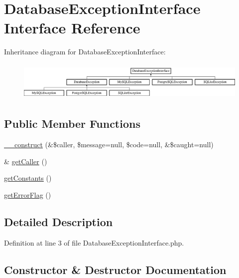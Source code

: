 \hypertarget{interface_database_exception_interface}{}\section{Database\+Exception\+Interface Interface Reference}
\label{interface_database_exception_interface}
Inheritance diagram for Database\+Exception\+Interface\+:\begin{figure}[H]
\begin{center}
\leavevmode
\includegraphics[height=1.887640cm]{interface_database_exception_interface}
\end{center}
\end{figure}
\subsection*{Public Member Functions}
\begin{DoxyCompactItemize}
\item 
\hyperlink{interface_database_exception_interface_ad1f01ac86a6ae06c72165c3a7cb0424a}{\+\_\+\+\_\+construct} (\&\$caller, \$message=null, \$code=null, \&\$caught=null)
\item 
\& \hyperlink{interface_database_exception_interface_aedb1e2149e60e99bd62a64f5533c7903}{get\+Caller} ()
\item 
\hyperlink{interface_database_exception_interface_a37357ff7fe8d1c1ea764fa1465637543}{get\+Constants} ()
\item 
\hyperlink{interface_database_exception_interface_aaf4fb3a4978596f9e37fdbdd1e786082}{get\+Error\+Flag} ()
\end{DoxyCompactItemize}


\subsection{Detailed Description}


Definition at line 3 of file Database\+Exception\+Interface.\+php.



\subsection{Constructor \& Destructor Documentation}
\hypertarget{interface_database_exception_interface_ad1f01ac86a6ae06c72165c3a7cb0424a}{}
